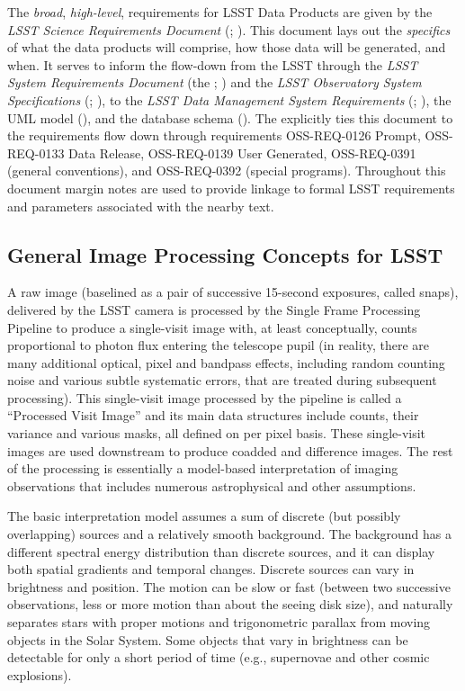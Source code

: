 The \emph{broad}, \emph{high-level}, requirements for LSST Data Products are given by the \emph{LSST Science Requirements Document} (\SRD; ). This document lays out the \emph{specifics} of what the data products will comprise, how those data will be generated, and when. It serves to inform the flow-down from the LSST \SRD through the \emph{LSST System Requirements Document} (the \LSR; ) and the \emph{LSST Observatory System Specifications} (\OSS; ), to the \emph{LSST Data Management System Requirements} (\DMSR; ), the UML model (\appsUMLdomain), and the database schema ().
The \OSS explicitly ties this document to the requirements flow down through requirements OSS-REQ-0126 Prompt, OSS-REQ-0133 Data Release, OSS-REQ-0139 User Generated, OSS-REQ-0391 (general conventions), and OSS-REQ-0392 (special programs).
Throughout this document margin notes are used to provide linkage to formal LSST requirements and parameters associated with the nearby text.

\subsection{General Image Processing Concepts for LSST}

 A raw image (baselined as a pair of successive 15-second exposures, called snaps),
delivered by the LSST camera is processed by the Single Frame Processing Pipeline to produce a single-visit image with, at least
conceptually, counts proportional to photon flux entering the
telescope pupil (in reality, there are many additional optical, pixel and
bandpass effects, including random counting noise and various subtle
systematic errors, that are treated during subsequent processing).
This single-visit image processed by the pipeline is called a ``Processed Visit Image'' and its main data structures include counts, their variance and
various masks, all defined on per pixel basis.
These single-visit images are used downstream to produce coadded and difference
images. The rest of the processing is essentially a model-based interpretation
of imaging observations that includes numerous astrophysical and other
assumptions.

The basic interpretation model assumes a sum of discrete (but possibly overlapping)
sources and a relatively smooth background. The background has a different
spectral energy distribution than discrete sources, and it can display both
spatial gradients and temporal changes. Discrete sources can vary
in brightness and position. The motion can be slow or fast (between two successive observations,
less or more motion than about the seeing disk size), and naturally separates stars
with proper motions and trigonometric parallax from moving objects in the Solar System.
Some objects that vary in brightness can be detectable for only a short period of time
(e.g., supernovae and other cosmic explosions).

